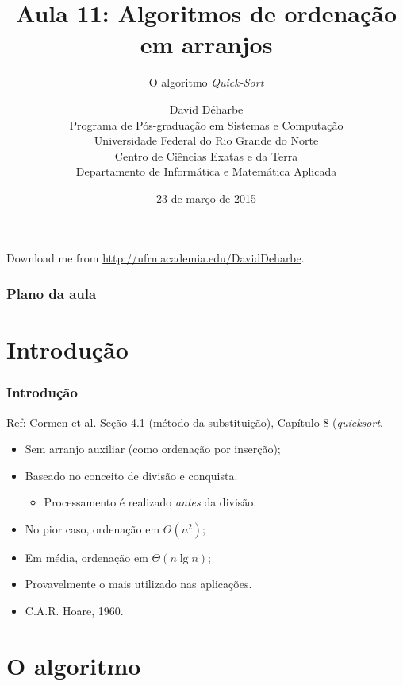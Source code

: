 \documentclass{beamer}
\title{Aula 11: Algoritmos de ordenação em arranjos}
\subtitle{O algoritmo \textit{Quick-Sort\/}}
\author{David Déharbe \\
  Programa de Pós-graduação em Sistemas e Computação \\
  Universidade Federal do Rio Grande do Norte \\
  Centro de Ciências Exatas e da Terra \\
  Departamento de Informática e Matemática Aplicada}
\date{23 de março de 2015}
\begin{document}
\begin{frame}
  \titlepage
  Download me from \url{http://ufrn.academia.edu/DavidDeharbe}.
\end{frame}

\begin{frame}
  \frametitle{Plano da aula}
  \tableofcontents
\end{frame}

\section{Introdução}

\begin{frame}
  \frametitle{Introdução}

  Ref: Cormen et al. Seção 4.1 (método da substituição), Capítulo 8 (\textit{quicksort}.

  \begin{itemize}
    \item Sem arranjo auxiliar (como ordenação por inserção);
    \item Baseado no conceito de divisão e conquista.
      \begin{itemize}
        \item Processamento é realizado \emph{antes\/} da divisão.
      \end{itemize}
    \item No pior caso, ordenação em $\Theta(n^2)$;
    \item Em média, ordenação em $\Theta(n \lg n)$;
    \item Provavelmente o mais utilizado nas aplicações.
      \pause
    \item C.A.R. Hoare, 1960.
  \end{itemize}

\end{frame}

\section{O algoritmo}
\end{document}
